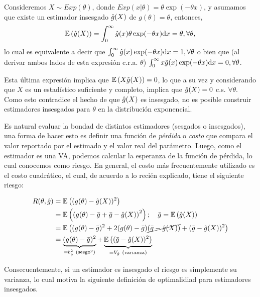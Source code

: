 \begin{example}
	\label{ex:estimador_exponancial}
	Consideremos $X\sim Exp(\theta)$, donde $Exp(x|\theta) = \theta\exp(-\theta x)$, y asumamos que existe un estimador insesgado ${ \hat{g}(X)}$ de $g(\theta) = \theta$, entonces, 
	\begin{equation}
		\mathbb{E} \left({ \hat{g}(X)}\right) = \int_0^\infty { \hat{g}(x)}\theta\exp(-\theta x){\text{d}} x = \theta, \forall \theta,
	\end{equation}
	lo cual es equivalente a decir que $\int_0^\infty { \hat{g}(x)}\exp(-\theta x){\text{d}} x = 1, \forall \theta$ o bien que (al derivar ambos lados de esta expresión c.r.a. $\theta$)  $\int_0^\infty x{ \hat{g}(x)}\exp(-\theta x){\text{d}} x = 0, \forall \theta$.

	Esta última expresión implica que $\mathbb{E} \left(X{ \hat{g}(X)}\right) = 0$, lo que a su vez y considerando que $X$ es un estadístico suficiente y completo, implica que ${ \hat{g}(X)}=0$ c.s. $\forall \theta$. Como esto contradice el hecho de que ${ \hat{g}(X)}$ es insesgado, no es posible construir estimadores insesgados para $\theta$ en la distribución exponencial.
\end{example}

Es natural evaluar la bondad de distintos estimadores (sesgados o insesgados), una forma de hacer esto es definir una función de \textit{pérdida} o \textit{costo} que compara el valor reportado por el estimado y el valor real del parámetro. Luego, como el estimador es una VA, podemos calcular la esperanza de la función de pérdida, lo cual conocemos como riesgo. En general, el costo más frecuentemente utilizado es el costo cuadrático, el cual, de acuerdo a lo recién explicado, tiene el siguiente riesgo: 

\begin{alignat*}{3}
 	R(\theta, \hat{g})  &= \mathbb{E} \left((g(\theta) - { \hat{g}(X)})^2\right)\\
 						& = \mathbb{E} \left(\left(g(\theta) - \bar{g}+ \bar{g} -{ \hat{g}(X)}\right)^2\right); \quad \bar{g} = \mathbb{E} \left( { \hat{g}(X)}\right)\\
 						& = \mathbb{E} \left((g(\theta) - \bar{g})^2+2(g(\theta) - \bar{g})\cancel{(\bar{g} -{ \hat{g}(X)})} +  (\bar{g} -{ \hat{g}(X)})^2\right)\\
 						& = \underbrace{(g(\theta) - \bar{g})^2}_{=b_{{ \hat{g}}}^2\ (\text{sesgo}^2)} +  \underbrace{\mathbb{E} \left((\bar{g} -{ \hat{g}(X)})^2\right)}_{=V_{{ \hat{g}}}\ \text{(varianza)}}
 \end{alignat*} 

 Consecuentemente, si un estimador es insesgado el riesgo es simplemente su varianza, lo cual motiva la siguiente definición de optimalidiad para estimadores insesgados. 

 \begin{definition}
  	
  \end{definition} 